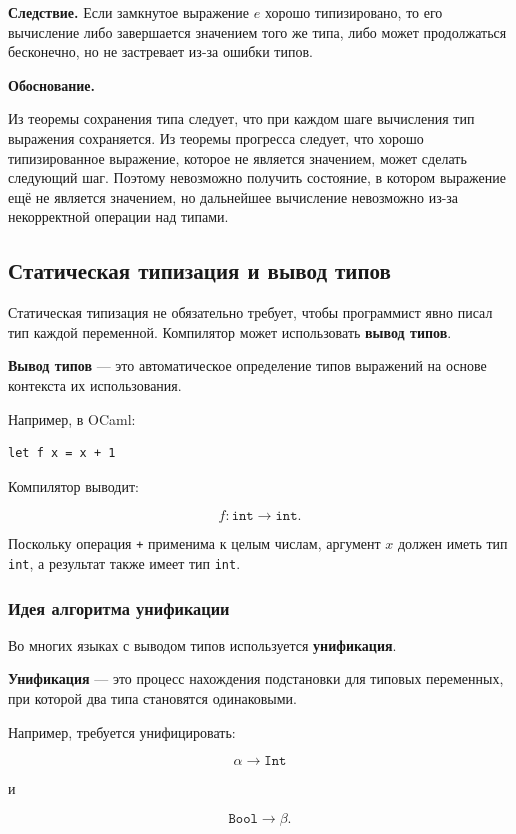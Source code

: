 \documentclass[12pt,a4paper]{article}
\begin{document}
\textbf{Следствие.}
Если замкнутое выражение \(e\) хорошо типизировано, то его вычисление либо
завершается значением того же типа, либо может продолжаться бесконечно, но не
застревает из-за ошибки типов.

\textbf{Обоснование.}

Из теоремы сохранения типа следует, что при каждом шаге вычисления тип выражения
сохраняется. Из теоремы прогресса следует, что хорошо типизированное выражение,
которое не является значением, может сделать следующий шаг. Поэтому невозможно
получить состояние, в котором выражение ещё не является значением, но дальнейшее
вычисление невозможно из-за некорректной операции над типами.

\subsection{Статическая типизация и вывод типов}

Статическая типизация не обязательно требует, чтобы программист явно писал тип
каждой переменной. Компилятор может использовать \textbf{вывод типов}.

\textbf{Вывод типов} --- это автоматическое определение типов выражений на основе
контекста их использования.

Например, в OCaml:

\begin{verbatim}
let f x = x + 1
\end{verbatim}

Компилятор выводит:

\[
f : \texttt{int} \to \texttt{int}.
\]

Поскольку операция \texttt{+} применима к целым числам, аргумент \(x\) должен иметь
тип \texttt{int}, а результат также имеет тип \texttt{int}.

\subsubsection{Идея алгоритма унификации}

Во многих языках с выводом типов используется \textbf{унификация}.

\textbf{Унификация} --- это процесс нахождения подстановки для типовых переменных,
при которой два типа становятся одинаковыми.

Например, требуется унифицировать:

\[
\alpha \to \texttt{Int}
\]

и

\[
\texttt{Bool} \to \beta.
\]
\end{document}
